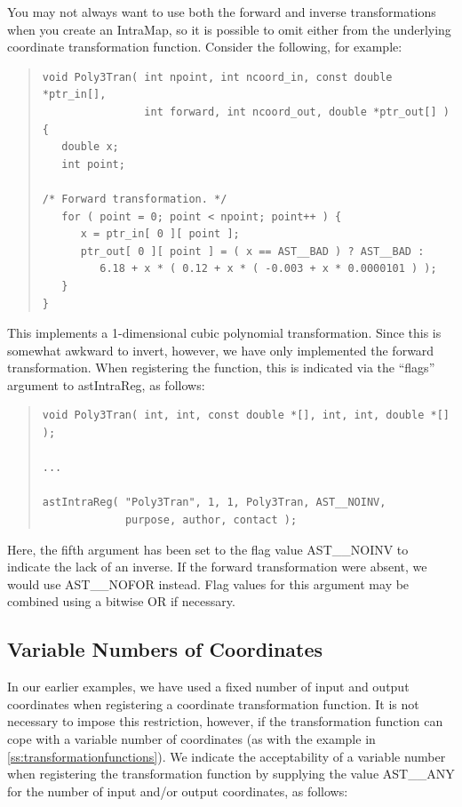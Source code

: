 \documentclass[twoside,11pt]{article}
\newcommand{\htmlref}[2]{#1}
\newcommand{\secref}[1]{\S\ref{#1}}
\renewcommand{\secref}[1]{\ref{#1}}
\begin{document}
You may not always want to use both the forward and inverse
transformations when you create an \htmlref{IntraMap}{IntraMap}, so it is possible to omit
either from the underlying coordinate transformation
function. Consider the following, for example:

\begin{quote}
\small
\begin{verbatim}
void Poly3Tran( int npoint, int ncoord_in, const double *ptr_in[],
                int forward, int ncoord_out, double *ptr_out[] ) {
   double x;
   int point;

/* Forward transformation. */
   for ( point = 0; point < npoint; point++ ) {
      x = ptr_in[ 0 ][ point ];
      ptr_out[ 0 ][ point ] = ( x == AST__BAD ) ? AST__BAD :
         6.18 + x * ( 0.12 + x * ( -0.003 + x * 0.0000101 ) );
   }
}
\end{verbatim}
\normalsize
\end{quote}

This implements a 1-dimensional cubic polynomial transformation. Since
this is somewhat awkward to invert, however, we have only implemented
the forward transformation.  When registering the function, this is
indicated via the ``flags'' argument to \htmlref{astIntraReg}{astIntraReg}, as follows:

\begin{quote}
\small
\begin{verbatim}
void Poly3Tran( int, int, const double *[], int, int, double *[] );

...

astIntraReg( "Poly3Tran", 1, 1, Poly3Tran, AST__NOINV,
             purpose, author, contact );
\end{verbatim}
\normalsize
\end{quote}

Here, the fifth argument has been set to the flag value AST\_\_NOINV
to indicate the lack of an inverse. If the forward transformation were
absent, we would use AST\_\_NOFOR instead. Flag values for this
argument may be combined using a bitwise OR if necessary.

\subsection{\label{ss:variableintramapcoordinates}Variable Numbers of Coordinates}

In our earlier examples, we have used a fixed number of input and
output coordinates when registering a coordinate transformation
function. It is not necessary to impose this restriction, however, if
the transformation function can cope with a variable number of
coordinates (as with the example in
\secref{ss:transformationfunctions}). We indicate the acceptability of
a variable number when registering the transformation function by
supplying the value AST\_\_ANY for the number of input and/or output
coordinates, as follows:
\end{document}
